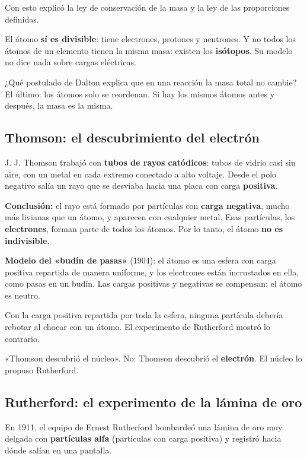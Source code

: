 Con esto explicó la ley de conservación de la masa y la ley de las proporciones definidas.

  
\begin{ojo}[{Limitaciones}] El átomo \textbf{sí es divisible}: tiene electrones, protones y neutrones. Y no todos los átomos de un elemento tienen la misma masa: existen los \textbf{isótopos}. Su modelo no dice nada sobre cargas eléctricas.\end{ojo}
 
\begin{ejemplo} ¿Qué postulado de Dalton explica que en una reacción la masa total no cambie? El último: los átomos solo se reordenan. Si hay los mismos átomos antes y después, la masa es la misma.\end{ejemplo}
\subsection{Thomson: el descubrimiento del electrón}
J. J. Thomson trabajó con \textbf{tubos de rayos catódicos}: tubos de vidrio casi sin aire, con un metal en cada extremo conectado a alto voltaje. Desde el polo negativo salía un rayo que se desviaba hacia una placa con carga \textbf{positiva}.

 

\textbf{Conclusión:} el rayo está formado por partículas con \textbf{carga negativa}, mucho más livianas que un átomo, y aparecen con cualquier metal. Esas partículas, los \textbf{electrones}, forman parte de todos los átomos. Por lo tanto, el átomo \textbf{no es indivisible}.

 

\textbf{Modelo del «budín de pasas»} (1904): el átomo es una esfera con carga positiva repartida de manera uniforme, y los electrones están incrustados en ella, como pasas en un budín. Las cargas positivas y negativas se compensan: el átomo es neutro.

  
\begin{ojo}[{Limitación}] Con la carga positiva repartida por toda la esfera, ninguna partícula debería rebotar al chocar con un átomo. El experimento de Rutherford mostró lo contrario.\end{ojo}
 
\begin{clave} «Thomson descubrió el núcleo». No: Thomson descubrió el \textbf{electrón}. El núcleo lo propuso Rutherford.\end{clave}
\subsection{Rutherford: el experimento de la lámina de oro}
En 1911, el equipo de Ernest Rutherford bombardeó una lámina de oro muy delgada con \textbf{partículas alfa} (partículas con carga positiva) y registró hacia dónde salían en una pantalla.

